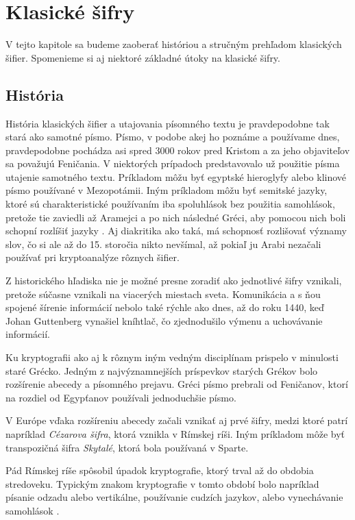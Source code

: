 \section{Klasické šifry}
V tejto kapitole sa budeme zaoberať históriou a stručným prehľadom klasických šifier.
Spomenieme si aj niektoré základné útoky na klasické šifry. 

\subsection{História}
História klasických šifier a utajovania písomného textu je pravdepodobne tak stará ako samotné písmo.
Písmo, v podobe akej ho poznáme a používame dnes, pravdepodobne pochádza asi spred 3000 rokov pred Kristom a za jeho objaviteľov sa považujú
Feničania.
V niektorých prípadoch predstavovalo už použitie písma utajenie samotného textu.
Príkladom môžu byť egyptské hieroglyfy alebo klinové písmo používané v Mezopotámii.
Iným príkladom môžu byť semitské jazyky, ktoré sú charakteristické používaním iba spoluhlások bez použitia samohlások,
pretože tie zaviedli až Aramejci a po nich následné Gréci, aby pomocou nich boli schopní rozlíšiť jazyky \cite{ks}.
Aj diakritika ako taká, má schopnosť rozlišovať významy slov, čo si ale až do 15. storočia nikto nevšímal,
až pokiaľ ju Arabi nezačali používať pri kryptoanalýze rôznych šifier.

Z historického hľadiska nie je možné presne zoradiť ako jednotlivé šifry vznikali, pretože súčasne vznikali na viacerých miestach sveta.
Komunikácia a s ňou spojené šírenie informácií nebolo také rýchle ako dnes, až do roku 1440, keď Johan Guttenberg vynašiel kníhtlač,
čo zjednodušilo výmenu a uchovávanie informácií.

Ku kryptografii ako aj k rôznym iným vedným disciplínam prispelo v minulosti staré Grécko.
Jedným z najvýznamnejších príspevkov starých Grékov bolo rozšírenie abecedy a písomného prejavu.
Gréci písmo prebrali od Feničanov, ktorí na rozdiel od Egypťanov používali jednoduchšie písmo.

V Európe vďaka rozšíreniu abecedy začali vznikať aj prvé šifry, medzi ktoré patrí napríklad \textit{Cézarova šifra}, ktorá vznikla v Rímskej ríši.
Iným príkladom môže byť transpozičná šifra \textit{Skytalé}, ktorá bola používaná v Sparte.

Pád Rímskej ríše spôsobil úpadok kryptografie, ktorý trval až do obdobia stredoveku. Typickým znakom kryptografie v tomto období bolo
napríklad písanie odzadu alebo vertikálne, používanie cudzích jazykov, alebo vynechávanie samohlások \cite{ks}.

